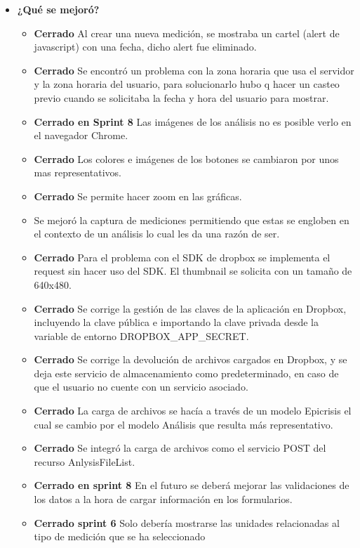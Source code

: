 \begin{itemize}
 		\item \textbf{¿Qué se mejoró?}
 		\begin{itemize}
 			\item \textbf{Cerrado} Al crear una nueva medición, se mostraba un cartel (alert de javascript) con una fecha, dicho alert fue eliminado.
 			\item \textbf{Cerrado} Se encontró un problema con la zona horaria que usa el servidor y la zona horaria del usuario, para solucionarlo hubo q hacer un casteo previo cuando se solicitaba la fecha y hora del usuario para mostrar.
			\item \textbf{Cerrado en Sprint 8} Las imágenes de los análisis no es posible verlo en el navegador Chrome.
			\item \textbf{Cerrado} Los colores e imágenes de los botones se cambiaron por unos mas representativos.
			\item \textbf{Cerrado} Se permite hacer zoom en las gráficas.
			\item Se mejoró la captura de mediciones permitiendo que estas se engloben en el contexto de un análisis lo cual les da una razón de ser.
            \item \textbf{Cerrado} Para el problema con el SDK de dropbox se implementa el request sin hacer uso del SDK. El thumbnail se solicita con un tamaño de 640x480.
            \item \textbf{Cerrado} Se corrige la gestión de las claves de la aplicación en Dropbox, incluyendo la clave pública e importando la clave privada desde la variable de entorno DROPBOX\_APP\_SECRET.
            \item \textbf{Cerrado} Se corrige la devolución de archivos cargados en Dropbox, y se deja este servicio de almacenamiento como predeterminado, en caso de que el usuario no cuente con un servicio asociado.
            \item \textbf{Cerrado} La carga de archivos se hacía a través de un modelo Epicrisis el cual se cambio por el modelo Análisis que resulta más representativo.
            \item \textbf{Cerrado} Se integró la carga de archivos como el servicio POST del recurso AnlysisFileList.	
			\item \textbf{Cerrado en sprint 8} En el futuro se deberá mejorar las validaciones de los datos a la hora de cargar información en los formularios.   
 			\item \textbf{Cerrado sprint 6} Solo debería mostrarse las unidades relacionadas al tipo de medición que se ha seleccionado	

\end{itemize}
\end{itemize}
